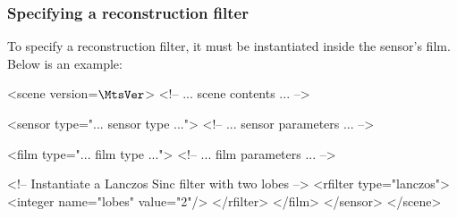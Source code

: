 \subsubsection{Specifying a reconstruction filter}
To specify a reconstruction filter, it must be instantiated inside
the sensor's film. Below is an example:
\begin{xml}
<scene version=$\MtsVer$>
	<!-- ... scene contents ... -->

	<sensor type="... sensor type ...">
		<!-- ... sensor parameters ... -->

		<film type="... film type ...">
			<!-- ... film parameters ... -->

			<!-- Instantiate a Lanczos Sinc filter with two lobes -->
			<rfilter type="lanczos">
				<integer name="lobes" value="2"/>
			</rfilter>
		</film>
	</sensor>
</scene>
\end{xml}

